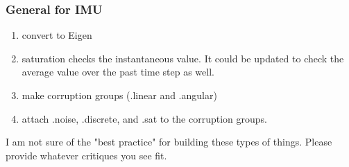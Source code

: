 \documentclass[]{BasiliskReportMemo}
\begin{document}
\subsubsection{General for IMU}
\begin{enumerate}
	\item convert to Eigen
	\item saturation checks the instantaneous value. It could be updated to check the average value over the past time step as well.
	\item make corruption groups (.linear and .angular)
	\item attach .noise, .discrete, and .sat to the corruption groups.
\end{enumerate}

I am not sure of the "best practice" for building these types of things. Please provide whatever critiques you see fit.





\end{document}

